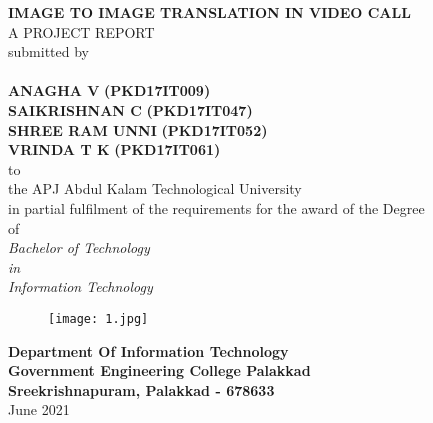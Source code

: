 \documentclass[12pt, a4paper]{report}
\begin{document}
\begin{titlepage} 
  
\begin{center} 
\vspace*{-1cm} 
{\Large \bfseries IMAGE TO IMAGE TRANSLATION IN VIDEO CALL} \\[2mm] 
{\fontsize{5mm}{1mm}  A PROJECT REPORT } \\[3mm] 
{\large  submitted by} \\[4mm] 
{\fontsize{5mm}{1mm}\Large \bfseries  } \\[2mm] 
    {\normalsize \textbf{ ANAGHA V}} \small{\textbf{(PKD17IT009)}}  \\
    {\normalsize \textbf{ SAIKRISHNAN C}} \small{\textbf{(PKD17IT047)}} \\
    {\normalsize \textbf{SHREE RAM UNNI}} \small{\textbf{(PKD17IT052)}}  \\ 
    {\normalsize \textbf{VRINDA T K }} \small{\textbf{(PKD17IT061)}}  \\[6mm] 
{\large  to } \\[3mm] 
{\large  the APJ Abdul Kalam Technological University} \\[2mm] 
{\large  in partial fulﬁlment of the requirements for the award of the Degree} \\[2mm] 
{\large  of } \\[3mm] 
{\fontsize{5mm}{1mm} \textit {Bachelor of Technology} } \\[2mm] 
{\large  \textit{in} } \\[2mm] 
{\fontsize{5mm}{1mm} \textit {Information Technology} } \\[2mm] 
\begin{figure}[ht!] 
    \centering 
    \texttt{[image: 1.jpg]} 
\end{figure} 
{\large \bfseries Department Of Information Technology} \\[2mm] 
{\large \bfseries Government Engineering College Palakkad} \\[2mm] 
{\large \bfseries Sreekrishnapuram, Palakkad - 678633} \\[2mm] 
{\large June 2021} \\[4.5mm] 
\end{center} 
\pagebreak 
\end{titlepage} 
\newpage
\pagebreak
\end{document}
